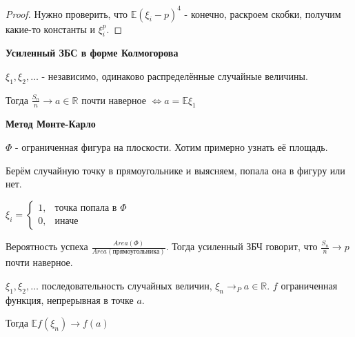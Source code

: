 \begin{proof}
    Нужно проверить, что $\mathbb{E}(\xi_i - p)^4$ - конечно, раскроем скобки, получим какие-то константы и $\xi_i^p$.
\end{proof}

\begin{theorem}
    \textbf{Усиленный ЗБС в форме Колмогорова}

    $\xi_1, \xi_2, \ldots$ - независимо, одинаково распределённые случайные величины.

    Тогда $\frac{S_n}{n} \rightarrow a \in \mathbb{R}$ почти наверное $\Leftrightarrow a = \mathbb{E}\xi_1$
\end{theorem}


\textbf{Метод Монте-Карло}

$\Phi$ - ограниченная фигура на плоскости. Хотим примерно узнать её площадь.

Берём случайную точку в прямоугольнике и выясняем, попала она в фигуру или нет.

$
\xi_i = 
\begin{cases}
    1, & \text{точка попала в $\Phi$} \\
    0, & \text{иначе}
\end{cases}
$

Вероятность успеха $\frac{Area(\Phi)}{Area(\text{прямоугольника})}$. Тогда усиленный ЗБЧ
говорит, что $\frac{S_n}{n} \rightarrow p$ почти наверное.

\begin{theorem}
    $\xi_1, \xi_2, \ldots$ последовательность случайных величин, $\xi_n \rightarrow_P a \in \mathbb{R}$.
    $f$ ограниченная функция, непрерывная в точке $a$.

    Тогда $\mathbb{E}f(\xi_n) \rightarrow f(a)$
\end{theorem}

